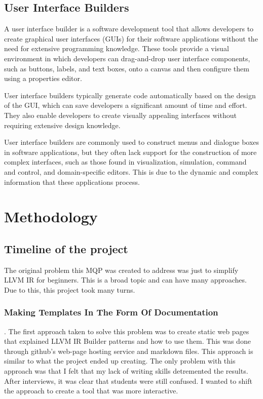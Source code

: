 \documentclass[hidelinks,12pt]{article}
\begin{document}
\begin{doublespacing}
\subsection{User Interface Builders}
A user interface builder is a software development tool that allows developers to create graphical user interfaces (GUIs) for their software applications without the need for extensive programming knowledge. These tools provide a visual environment in which developers can drag-and-drop user interface components, such as buttons, labels, and text boxes, onto a canvas and then configure them using a properties editor.

User interface builders typically generate code automatically based on the design of the GUI, which can save developers a significant amount of time and effort. They also enable developers to create visually appealing interfaces without requiring extensive design knowledge.

User interface builders are commonly used to construct menus and dialogue boxes in software applications, but they often lack support for the construction of more complex interfaces, such as those found in visualization, simulation, command and control, and domain-specific editors. This is due to the dynamic and complex information that these applications process. 
\cite{szekely_beyond_993}

\section{Methodology}

\subsection{Timeline of the project}
The original problem this MQP was created to address was just to simplify LLVM IR for beginners. This is a broad topic and can have many approaches. Due to this, this project took many turns. 
\subsubsection*{Making Templates In The Form Of Documentation}.
The first approach taken to solve this problem was to create static web pages that explained LLVM IR Builder patterns and how to use them. This was done through github's web-page hosting service and markdown files.
This approach is similar to what the project ended up creating. The only problem with this approach was that I felt that my lack of writing skills detremented the results. After interviews, it was clear that students were still confused. I wanted to shift the approach to create a tool that was more interactive.

\end{doublespacing}
\end{document}

